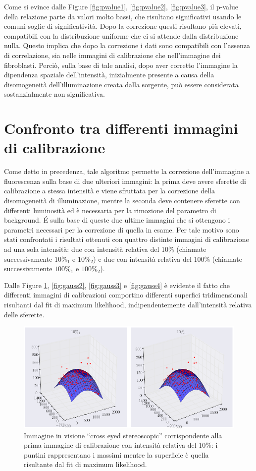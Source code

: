 Come si evince dalle Figure \ref{fig:pvalue1}, \ref{fig:pvalue2}, \ref{fig:pvalue3}, il p-value della relazione parte da valori molto bassi, che risultano significativi usando le comuni soglie di significatività.
Dopo la correzione questi risultano più elevati, compatibili con la distribuzione uniforme che ci si attende dalla distribuzione nulla.
Questo implica che dopo la correzione i dati sono compatibili con l'assenza di correlazione, sia nelle immagini di calibrazione che nell'immagine dei fibroblasti. 
Perciò, sulla base di tale analisi, dopo aver corretto l'immagine la dipendenza spaziale dell'intensità, inizialmente presente a causa della disomogeneità dell'illuminazione creata dalla sorgente, può essere considerata sostanzialmente non significativa.


\section{Confronto tra differenti immagini di calibrazione}

Come detto in precedenza, tale algoritmo permette la correzione dell'immagine a fluorescenza sulla base di due ulteriori immagini: la prima deve avere sferette di calibrazione a stessa intensità e viene sfruttata per la correzione della disomogeneità di illuminazione, mentre la seconda deve contenere sferette con differenti luminosità ed è necessaria per la rimozione del parametro di background. 
\'E sulla base di queste due ultime immagini che si ottengono i parametri necessari per la correzione di quella in esame.
Per tale motivo sono stati confrontati i risultati ottenuti con quattro distinte immagini di calibrazione ad una sola intensità: due con intensità relativa del 10\% (chiamate successivamente $10\%_1$ e $10\%_2$) e due con intensità relativa del 100\% (chiamate successivamente $100\%_1$ e $100\%_2$).

Dalle Figure \ref{fig:gauss1}, \ref{fig:gauss2}, \ref{fig:gauss3} e \ref{fig:gauss4} è evidente il fatto che differenti immagini di calibrazioni comportino differenti superfici tridimensionali risultanti dal fit di maximum likelihood, indipendentemente dall'intensità relativa delle sferette.

\begin{figure}
 \centering
 \includegraphics[scale=.45]{img/CAP4gauss1.png}
 \caption{\small{Immagine in visione ``cross eyed stereoscopic'' corrispondente alla prima immagine di calibrazione con intensità relativa del 10\%: i puntini rappresentano i massimi mentre la superficie è quella risultante dal fit di maximum likelihood.}}
 \label{fig:gauss1}
\end{figure}

